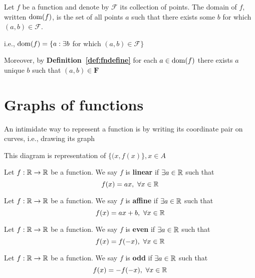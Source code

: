 \begin{definition}
    Let $f$ be a function and denote by $\mathcal{F}$ its collection of points. The domain of $f$, written $\operatorname{dom}(f)$, is the set of all points $a$ such that there exists some $b$ for which $(a, b) \in \mathcal{F}$.
\end{definition}
i.e., $\operatorname{dom}(f) = \{a: \exists b$ for which $(a, b) \in \mathcal{F}\}$

Moreover, by \textbf{Definition~\ref{def:fndefine}} for each $a\in\operatorname{dom}(f)$ there exists $a$ unique $b$ such that $(a, b) \in \mathbf{F}$

\section{Graphs of functions}
An intimidate way to represent a function is by writing its coordinate pair on curves, i.e., drawing its graph

\begin{center}

This diagram is representation of $\{(x, f(x)\}, x\in A$
\end{center}

\begin{definition}
    Let $f: \mathbb R \rightarrow \mathbb R$ be a function.
    We say $f$ is \textbf{linear} if $\exists a \in \mathbb R$ such that $$f(x) = ax,\ \forall x \in \mathbb R$$
\end{definition}
\begin{definition}
    Let $f: \mathbb R \rightarrow \mathbb R$ be a function.
    We say $f$ is \textbf{affine} if $\exists a \in \mathbb R$ such that $$f(x) = ax + b,\ \forall x \in \RR$$
\end{definition}\begin{definition}
    Let $f: \mathbb R \rightarrow \mathbb R$ be a function.
    We say $f$ is \textbf{even} if $\exists a \in \mathbb R$ such that $$f(x) = f(-x),\ \forall x \in \RR$$
\end{definition}\begin{definition}
    Let $f: \mathbb R \rightarrow \mathbb R$ be a function.
    We say $f$ is \textbf{odd} if $\exists a \in \mathbb R$ such that $$f(x) = -f(-x),\ \forall x \in \RR$$
\end{definition}

